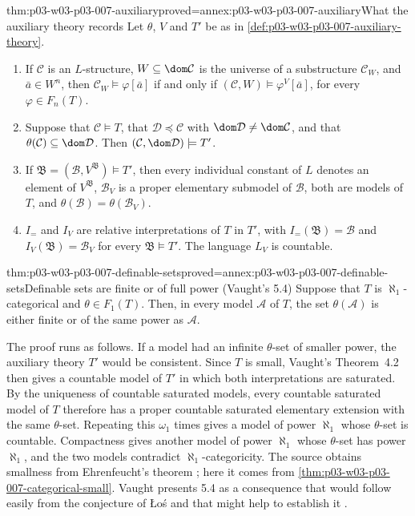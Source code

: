\begin{hblemma}{thm:p03-w03-p03-007-auxiliary}{proved=annex:p03-w03-p03-007-auxiliary}{What the auxiliary theory records}
Let \(\theta\), \(V\) and \(T'\) be as in
\cref{def:p03-w03-p03-007-auxiliary-theory}.
\begin{enumerate}
\item If \(\mathcal C\) is an \(L\)-structure, \(W\subseteq\dom\mathcal C\)
      is the universe of a substructure \(\mathcal C_W\), and
      \(\bar a\in W^n\), then
      \(\mathcal C_W\models\varphi[\bar a]\) if and only if
      \((\mathcal C,W)\models\varphi^V[\bar a]\), for every
      \(\varphi\in F_n(T)\).
\item Suppose that \(\mathcal C\models T\), that
      \(\mathcal D\preccurlyeq\mathcal C\) with
      \(\dom\mathcal D\neq\dom\mathcal C\), and that
      \(\theta(\mathcal C)\subseteq\dom\mathcal D\). Then
      \((\mathcal C,\dom\mathcal D)\models T'\).
\item If \(\mathfrak B=(\mathcal B,V^{\mathfrak B})\models T'\), then every
      individual constant of \(L\) denotes an element of \(V^{\mathfrak B}\),
      \(\mathcal B_V\) is a proper elementary submodel of \(\mathcal B\),
      both are models of \(T\), and
      \(\theta(\mathcal B)=\theta(\mathcal B_V)\).
\item \(I_=\) and \(I_V\) are relative interpretations of \(T\) in \(T'\),
      with \(I_=(\mathfrak B)=\mathcal B\) and
      \(I_V(\mathfrak B)=\mathcal B_V\) for every \(\mathfrak B\models T'\).
      The language \(L_V\) is countable.
\end{enumerate}
\end{hblemma}

\begin{hbtheorem}{thm:p03-w03-p03-007-definable-sets}{proved=annex:p03-w03-p03-007-definable-sets}{Definable sets are finite or of full power (Vaught's 5.4)}
Suppose that \(T\) is \(\aleph_1\)-categorical and \(\theta\in F_1(T)\).
Then, in every model \(\mathcal A\) of \(T\), the set \(\theta(\mathcal A)\)
is either finite or of the same power as \(\mathcal A\).
\end{hbtheorem}

The proof runs as follows. If a model had an infinite \(\theta\)-set of
smaller power, the auxiliary theory \(T'\) would be consistent. Since \(T\) is
small, Vaught's Theorem~4.2 then gives a countable model of \(T'\) in which
both interpretations are saturated. By the uniqueness of countable saturated
models, every countable saturated model of \(T\) therefore has a proper
countable saturated elementary extension with the same \(\theta\)-set.
Repeating this \(\omega_1\) times gives a model of power \(\aleph_1\) whose
\(\theta\)-set is countable. Compactness gives another model of power
\(\aleph_1\) whose \(\theta\)-set has power \(\aleph_1\), and the two models
contradict \(\aleph_1\)-categoricity. The source obtains smallness from
Ehrenfeucht's theorem \cite[p.~317]{Vaught1961}; here it comes from
\cref{thm:p03-w03-p03-007-categorical-small}. Vaught presents 5.4 as a
consequence that would follow easily from the conjecture of Łoś and that
might help to establish it \cite[p.~316]{Vaught1961}.

